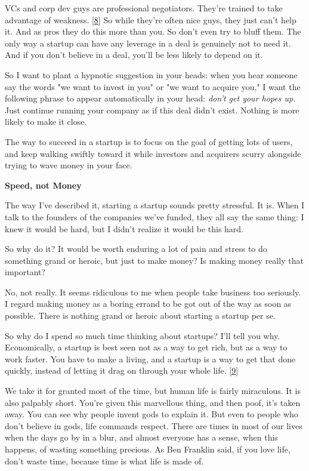 VCs and corp dev guys are professional negotiators.  They're trained
to take advantage of weakness. 
[\href{\#f8n}{8}]
So while they're often nice
guys, they just can't help it.  And as pros they do this more than
you.  So don't even try to bluff them.  The only way a startup can
have any leverage in a deal is genuinely not to need it.  And if
you don't believe in a deal, you'll be less likely to depend on it.

So I want to plant a hypnotic suggestion in your heads: when you
hear someone say the words "we want to invest in you" or "we want
to acquire you," I want the following phrase to appear automatically
in your head: \emph{don't get your hopes up.}  Just continue running
your company as if this deal didn't exist.  Nothing is more likely
to make it close.

The way to succeed in a startup is to focus on the goal of getting
lots of users, and keep walking swiftly toward it while investors
and acquirers scurry alongside trying to wave money in your face.


\textbf{Speed, not Money}

The way I've described it, starting a startup sounds pretty stressful.
It is.  When I talk to the founders of the companies we've funded,
they all say the same thing: I knew it would be hard, but I didn't
realize it would be this hard.

So why do it?  It would be worth enduring a lot of pain and stress
to do something grand or heroic, but just to make money?  Is making
money really that important?

No, not really.  It seems ridiculous to me when people take business
too seriously.  I regard making money as a boring errand to be got
out of the way as soon as possible.  There is nothing grand or
heroic about starting a startup per se.

So why do I spend so much time thinking about startups?  I'll tell
you why.  Economically, a startup is best seen not as a way to get
rich, but as a way to work faster.  You have to make a living, and
a startup is a way to get that done quickly, instead of letting it
drag on through your whole life.
[\href{\#f9n}{9}]

We take it for granted most of the time, but human life is fairly
miraculous.  It is also palpably short.  You're given this marvellous
thing, and then poof, it's taken away.  You can see why people
invent gods to explain it.  But even to people who don't believe
in gods, life commands respect.  There are times in most of our
lives when the days go by in a blur, and almost everyone has a
sense, when this happens, of wasting something precious.  As Ben
Franklin said, if you love life, don't waste time, because time is
what life is made of.

